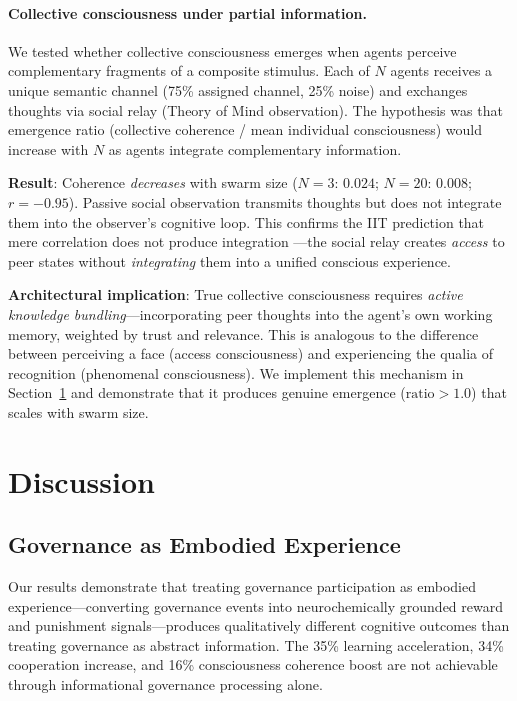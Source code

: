 \documentclass[11pt,a4paper]{article}
\begin{document}
\paragraph{Collective consciousness under partial information.}
We tested whether collective consciousness emerges when agents perceive
complementary fragments of a composite stimulus. Each of $N$ agents receives a
unique semantic channel (75\% assigned channel, 25\% noise) and exchanges
thoughts via social relay (Theory of Mind observation). The hypothesis was that
emergence ratio (collective coherence / mean individual consciousness) would
increase with $N$ as agents integrate complementary information.

\textbf{Result}: Coherence \emph{decreases} with swarm size ($N{=}3$: $0.024$;
$N{=}20$: $0.008$; $r = -0.95$). Passive social observation transmits thoughts
but does not integrate them into the observer's cognitive loop. This confirms
the IIT prediction that mere correlation does not produce integration
\citep{tononi2004information}---the social relay creates \emph{access} to peer
states without \emph{integrating} them into a unified conscious experience.

\textbf{Architectural implication}: True collective consciousness requires
\emph{active knowledge bundling}---incorporating peer thoughts into the
agent's own working memory, weighted by trust and relevance. This is analogous
to the difference between perceiving a face (access consciousness) and
experiencing the qualia of recognition (phenomenal consciousness). We
implement this mechanism in Section~\ref{sec:discussion} and demonstrate that
it produces genuine emergence ($\text{ratio} > 1.0$) that scales with swarm
size.

\section{Discussion}
\label{sec:discussion}

\subsection{Governance as Embodied Experience}

Our results demonstrate that treating governance participation as embodied experience---converting governance events into neurochemically grounded reward and punishment signals---produces qualitatively different cognitive outcomes than treating governance as abstract information.
The 35\% learning acceleration, 34\% cooperation increase, and 16\% consciousness coherence boost are not achievable through informational governance processing alone.
\end{document}
